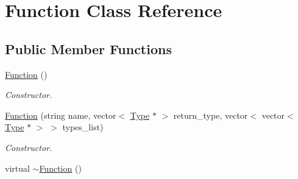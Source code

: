 \hypertarget{classFunction}{\section{Function Class Reference}
\label{classFunction}
}
\subsection*{Public Member Functions}
\begin{DoxyCompactItemize}
\item 
\hypertarget{classFunction_ae206568fd4fd4c885e3ccff76345c4e6}{\hyperlink{classFunction_ae206568fd4fd4c885e3ccff76345c4e6}{Function} ()}\label{classFunction_ae206568fd4fd4c885e3ccff76345c4e6}

\begin{DoxyCompactList}\small\item\em Constructor. \end{DoxyCompactList}\item 
\hyperlink{classFunction_a29bc5bc361e4efb7754fa36635841b79}{Function} (string name, vector$<$ \hyperlink{classType}{Type} $\ast$ $>$ return\+\_\+type, vector$<$ vector$<$ \hyperlink{classType}{Type} $\ast$ $>$ $>$ types\+\_\+list)
\begin{DoxyCompactList}\small\item\em Constructor. \end{DoxyCompactList}\item 
\hypertarget{classFunction_a3b03f7cf0b75d16edebdda1dee1db6fd}{virtual \hyperlink{classFunction_a3b03f7cf0b75d16edebdda1dee1db6fd}{$\sim$\+Function} ()}\label{classFunction_a3b03f7cf0b75d16edebdda1dee1db6fd}


\end{DoxyCompactItemize}

